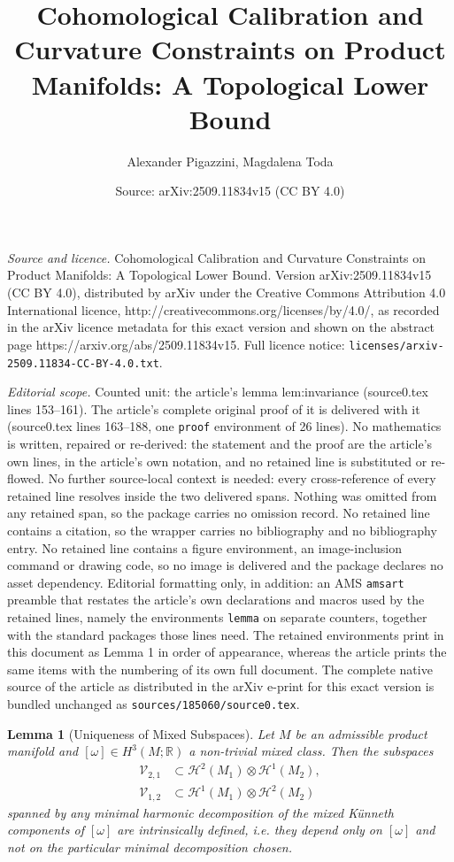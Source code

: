 \documentclass[10pt,a4paper]{amsart}
\title{Cohomological Calibration and Curvature Constraints on Product Manifolds: A Topological Lower Bound}
\author{Alexander Pigazzini, Magdalena Toda}
\date{Source: arXiv:2509.11834v15 (CC BY 4.0)}
\newtheorem{lemma}{Lemma}
\begin{document}
\maketitle

\noindent\emph{Source and licence.} Cohomological Calibration and Curvature Constraints on Product Manifolds: A Topological Lower Bound. Version arXiv:2509.11834v15 (CC BY 4.0), distributed by arXiv under the Creative Commons Attribution 4.0 International licence, http://creativecommons.org/licenses/by/4.0/, as recorded in the arXiv licence metadata for this exact version and shown on the abstract page https://arxiv.org/abs/2509.11834v15. Full licence notice: \texttt{licenses/arxiv-2509.11834-CC-BY-4.0.txt}.\par\smallskip

\noindent\textit{Editorial scope.} Counted unit: the article's lemma lem:invariance (source0.tex lines 153--161). The article's complete original proof of it is delivered with it (source0.tex lines 163--188, one \texttt{proof} environment of 26 lines). No mathematics is written, repaired or re-derived: the statement and the proof are the article's own lines, in the article's own notation, and no retained line is substituted or re-flowed.  No further source-local context is needed: every cross-reference of every retained line resolves inside the two delivered spans.  Nothing was omitted from any retained span, so the package carries no omission record.  No retained line contains a citation, so the wrapper carries no bibliography and no bibliography entry.  No retained line contains a figure environment, an image-inclusion command or drawing code, so no image is delivered and the package declares no asset dependency.  Editorial formatting only, in addition: an AMS \texttt{amsart} preamble that restates the article's own declarations and macros used by the retained lines, namely the environments \texttt{lemma} on separate counters, together with the standard packages those lines need.  The retained environments print in this document as Lemma 1 in order of appearance, whereas the article prints the same items with the numbering of its own full document.  The complete native source of the article as distributed in the arXiv e-print for this exact version is bundled unchanged as \texttt{sources/185060/source0.tex}.
\begin{lemma}[Uniqueness of Mixed Subspaces]\label{lem:invariance}
Let $M$ be an admissible product manifold and $[\omega]\in H^3(M;\mathbb{R})$
a non-trivial mixed class.  Then the subspaces
\begin{align}\label{eq:V-spaces}
\mathcal{V}_{2,1}&\subset\mathcal{H}^2(M_1)\otimes\mathcal{H}^1(M_2),\\
\mathcal{V}_{1,2}&\subset\mathcal{H}^1(M_1)\otimes\mathcal{H}^2(M_2)
\end{align}
spanned by any minimal harmonic decomposition of the mixed K\"unneth components of $[\omega]$ are \emph{intrinsically defined}, i.e. they depend only on $[\omega]$ and not on the particular minimal decomposition chosen.
\end{lemma}
\end{document}
